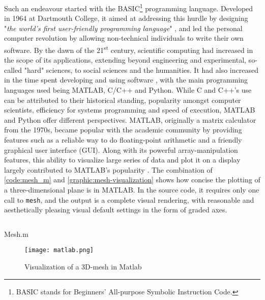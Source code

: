 Such an endeavour started with the BASIC\footnote{BASIC stands for Beginners' All-purpose Symbolic Instruction Code.} programming language. Developed in 1964 at Dartmouth College, it aimed at addressing this hurdle by designing "\emph{the world's first user-friendly programming language}" \citep{brooks_finally_2019}, and led the personal computer revolution by allowing non-technical individuals to write their own software. By the dawn of the 21\textsuperscript{st} century, scientific computing had increased in the scope of its applications, extending beyond engineering and experimental, so-called "hard" sciences, to social sciences and the humanities. It had also increased in the time spent developing and using software \citep{prabhu_survey_2011,hannay_how_2009}, with the main programming languages used being MATLAB, C/C++ and Python. While C and C++'s use can be attributed to their historical standing, popularity amongst computer scientists, efficiency for systems programming and speed of execution, MATLAB and Python offer different perspectives. MATLAB, originally a matrix calculator from the 1970s, became popular with the academic community by providing features such as a reliable way to do floating-point arithmetic and a friendly graphical user interface (GUI). Along with its powerful array-manipulation features, this ability to visualize large series of data and plot it on a display largely contributed to MATLAB's popularity \citep{moler_history_2020}. The combination of \autoref{code:mesh_m} and \autoref{graphic:mesh-visualization} shows how concise the plotting of a three-dimensional plane is in MATLAB. In the source code, it requires only one call to \lstinline{mesh}, and the output is a complete visual rendering, with reasonable and aesthetically pleasing visual default settings in the form of graded axes.

\begin{listing}
  \inputminted{matlab}{./corpus/mesh.matlab}
  \caption{Mesh.m}
  \label{code:mesh_m}
\end{listing}

\begin{figure}
  \texttt{[image: matlab.png]}
  \caption{Visualization of a 3D-mesh in Matlab}
  \label{graphic:mesh-visualization}
\end{figure}

